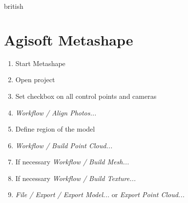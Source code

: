 \documentclass[./00PhotoBox.tex]{subfiles}
\begin{document}
\begin{otherlanguage*}{british}
    \section{Agisoft Metashape}
    \begin{enumerate}
        \item Start Metashape
        \item Open project
        \item Set checkbox on all control points and cameras
        \item \textit{Workflow / Align Photos...}
        \item Define region of the model
        \item \textit{Workflow / Build Point Cloud...}
        \item If necessary \textit{Workflow / Build Mesh...}
        \item If necessary \textit{Workflow / Build Texture...}
        \item \textit{File / Export / Export Model...} or \textit{Export Point Cloud...}
    \end{enumerate}

\end{otherlanguage*}
\biblio
\end{document}
